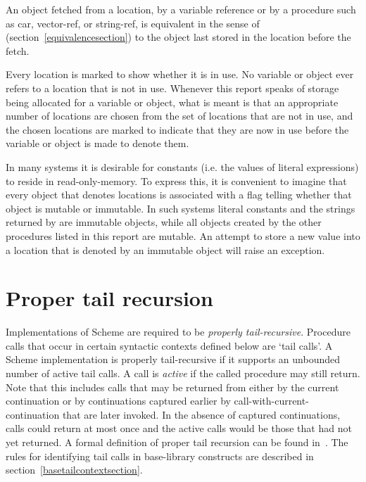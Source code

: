 An object fetched from a location, by a variable reference or by
a procedure such as {\cf car}, {\cf vector-ref}, or {\cf string-ref}, is
equivalent in the sense of  %
(section~\ref{equivalencesection})
to the object last stored in the location before the fetch.

Every location is marked to show whether it is in use.
No variable or object ever refers to a location that is not in use.
Whenever this report speaks of storage being allocated for a variable
or object, what is meant is that an appropriate number of locations are
chosen from the set of locations that are not in use, and the chosen
locations are marked to indicate that they are now in use before the variable
or object is made to denote them.

In many systems it is desirable for constants (i.e. the values of
literal expressions) to reside in read-only-memory.  To express this, it is
convenient to imagine that every object that denotes locations is associated
with a flag telling whether that object is mutable or
immutable.  In such systems literal constants and the strings
returned by  are immutable objects, while all objects
created by the other procedures listed in this report are mutable.  An
attempt to store a new value into a location that is denoted by an
immutable object will raise an exception.

\section{Proper tail recursion}
\label{proper tail recursion}

Implementations of Scheme are required to be
{\em properly tail-recursive}.
Procedure calls that occur in certain syntactic
contexts defined below are `tail calls'.  A Scheme implementation is
properly tail-recursive if it supports an unbounded number of active
tail calls.  A call is {\em active} if the called procedure may still
return.  Note that this includes calls that may be returned from either
by the current continuation or by continuations captured earlier by
{\cf call-with-current-continuation} that are later invoked.
In the absence of captured continuations, calls could
return at most once and the active calls would be those that had not
yet returned.
A formal definition of proper tail recursion can be found
in~\cite{propertailrecursion}.  The rules for identifying tail calls
in base-library constructs are described in
section~\ref{basetailcontextsection}.

